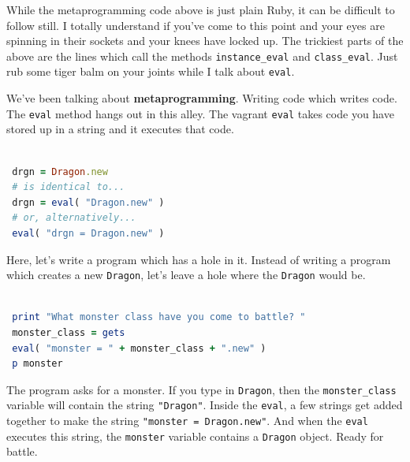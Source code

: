 \documentclass[10pt,twoside]{report}
\begin{document}
While the metaprogramming code above is just plain Ruby, it can be
difficult to follow still. I totally understand if you've come to this
point and your eyes are spinning in their sockets and your knees have
locked up.  The trickiest parts of the above are the lines which call
the methods \lstinline[breaklines=true]|instance_eval| and
\lstinline[breaklines=true]|class_eval|.  Just rub some tiger balm on
your joints while I talk about \lstinline[breaklines=true]|eval|.

We've been talking about {\bf metaprogramming}.  Writing code which
writes code.  The \lstinline[breaklines=true]|eval| method hangs out
in this alley. The vagrant \lstinline[breaklines=true]|eval| takes
code you have stored up in a string and it executes that code.


\begin{lstlisting}[basicstyle=\ttfamily\color{basiccolor},
    commentstyle = \ttfamily\color{commentcolor},
    keywordstyle=\ttfamily\color{keywordscolor},
    stringstyle=\color{stringcolor},
    language=Ruby,
    basicstyle=\small\ttfamily,
    showstringspaces=false,
  ]

 drgn = Dragon.new
 # is identical to...
 drgn = eval( "Dragon.new" )
 # or, alternatively...
 eval( "drgn = Dragon.new" )

\end{lstlisting}


Here, let's write a program which has a hole in it.  Instead of
writing a program which creates a new
\lstinline[breaklines=true]|Dragon|, let's leave a hole where the
\lstinline[breaklines=true]|Dragon| would be.


\begin{lstlisting}[basicstyle=\ttfamily\color{basiccolor},
    commentstyle = \ttfamily\color{commentcolor},
    keywordstyle=\ttfamily\color{keywordscolor},
    stringstyle=\color{stringcolor},
    language=Ruby,
    basicstyle=\small\ttfamily,
    showstringspaces=false,
  ]

 print "What monster class have you come to battle? "
 monster_class = gets
 eval( "monster = " + monster_class + ".new" )
 p monster

\end{lstlisting}


The program asks for a monster.  If you type in
\lstinline[breaklines=true]|Dragon|, then the
\lstinline[breaklines=true]|monster_class| variable will contain the
string \lstinline[breaklines=true]|"Dragon"|.  Inside the
\lstinline[breaklines=true]|eval|, a few strings get added together to
make the string \lstinline[breaklines=true]|"monster = Dragon.new"|.
And when the \lstinline[breaklines=true]|eval| executes this string,
the \lstinline[breaklines=true]|monster| variable contains a
\lstinline[breaklines=true]|Dragon| object.  Ready for battle.
\end{document}

